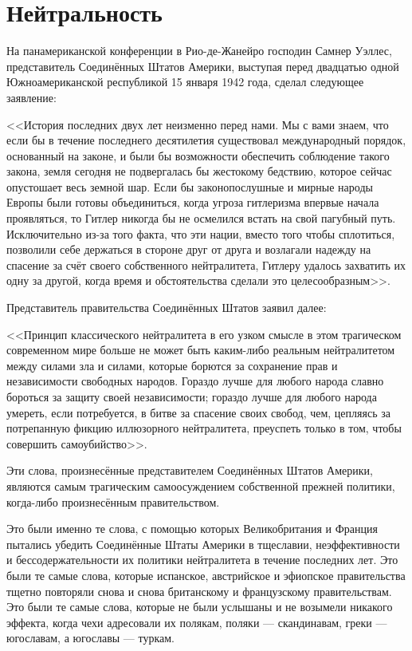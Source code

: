 \chapter{Нейтральность}

На панамериканской конференции в Рио-де-Жанейро господин Самнер Уэллес, представитель Соединённых Штатов Америки, выступая перед двадцатью одной Южноамериканской республикой 15 января 1942 года, сделал следующее заявление:
 
<<История последних двух лет неизменно перед нами. Мы с вами знаем, что если бы в течение последнего десятилетия существовал международный порядок, основанный на законе, и были бы возможности обеспечить соблюдение такого закона, земля сегодня не подвергалась бы жестокому бедствию, которое сейчас опустошает весь земной шар. Если бы законопослушные и мирные народы Европы были готовы объединиться, когда угроза гитлеризма впервые начала проявляться, то Гитлер никогда бы не осмелился встать на свой пагубный путь. Исключительно из-за того факта, что эти нации, вместо того чтобы сплотиться, позволили себе держаться в стороне друг от друга и возлагали надежду на спасение за счёт своего собственного нейтралитета, Гитлеру удалось захватить их одну за другой, когда время и обстоятельства сделали это целесообразным>>.

Представитель правительства Соединённых Штатов заявил далее:

<<Принцип классического нейтралитета в его узком смысле в этом трагическом современном мире больше не может быть каким-либо реальным нейтралитетом между силами зла и силами, которые борются за сохранение прав и независимости свободных народов. Гораздо лучше для любого народа славно бороться за защиту своей независимости; гораздо лучше для любого народа умереть, если потребуется, в битве за спасение своих свобод, чем, цепляясь за потрепанную фикцию иллюзорного нейтралитета, преуспеть только в том, чтобы совершить самоубийство>>.

Эти слова, произнесённые представителем Соединённых Штатов Америки, являются самым трагическим самоосуждением собственной прежней политики, когда-либо произнесённым правительством.

Это были именно те слова, с помощью которых Великобритания и Франция пытались убедить Соединённые Штаты Америки в тщеславии, неэффективности и бессодержательности их политики нейтралитета в течение последних лет. Это были те самые слова, которые испанское, австрийское и эфиопское правительства тщетно повторяли снова и снова британскому и французскому правительствам. Это были те самые слова, которые не были услышаны и не возымели никакого эффекта, когда чехи адресовали их полякам, поляки — скандинавам, греки — югославам, а югославы — туркам.

